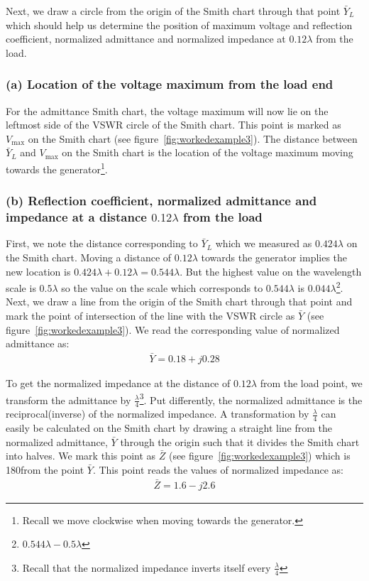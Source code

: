 \begin{exmp}
Next, we draw a circle from the origin of the Smith chart through that point $\bar{Y}_L$ which should help us determine the position of maximum voltage and reflection coefficient, normalized admittance and normalized impedance at $0.12\lambda$ from the load.

\subsubsection*{(a) Location of the voltage maximum from the load end}
For the admittance Smith chart, the voltage maximum will now lie on the leftmost side of the VSWR circle of the Smith chart. This point is marked as $V_\max$ on the Smith chart (see figure~\ref{fig:workedexample3}). The distance between $\bar{Y}_L$ and $V_\max$ on the Smith chart is the location of the voltage maximum moving towards the generator\footnote{
Recall we move clockwise when moving towards the generator.
}.

\subsubsection*{(b) Reflection coefficient, normalized admittance and impedance at a distance $0.12\lambda$ from the load}
First, we note the distance corresponding to $\bar{Y}_L$ which we measured as $0.424\lambda$ on the Smith chart. Moving a distance of $0.12\lambda$ towards the generator implies the new location is $0.424\lambda + 0.12\lambda = 0.544\lambda$. But the highest value on the wavelength scale is $0.5\lambda$ so the value on the scale which corresponds to $0.544\lambda$ is $0.044\lambda$\footnote{
$0.544\lambda-0.5\lambda$
}. Next, we draw a line from the origin of the Smith chart through that point and mark the point of intersection of the line with the VSWR circle as $\bar{Y}$ (see figure~\ref{fig:workedexample3}). We read the corresponding value of normalized admittance as:
\begin{align*}
\bar{Y} = 0.18 + j0.28
\end{align*}

To get the normalized impedance at the distance of $0.12\lambda$ from the load point, we transform the admittance by $\frac{\lambda}{4}$\footnote{
Recall that the normalized impedance inverts itself every $\frac{\lambda}{4}$
}. Put differently, the normalized admittance is the reciprocal(inverse) of the normalized impedance. A transformation by $\frac{\lambda}{4}$ can easily be calculated on the Smith chart by drawing a straight line from the normalized admittance, $\bar{Y}$ through the origin such that it divides the Smith chart into halves. We mark this point as $\bar{Z}$ (see figure~\ref{fig:workedexample3}) which is 180\textdegree from the point $\bar{Y}$. This point reads the values of normalized impedance as:
\begin{align*}
\bar{Z} = 1.6 - j2.6
\end{align*}


\end{exmp}
